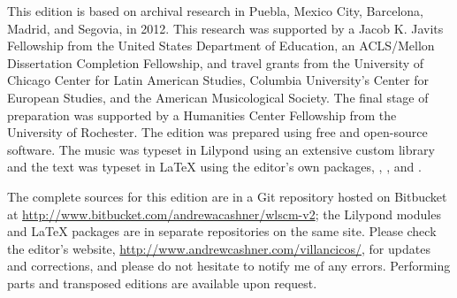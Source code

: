 This edition is based on archival research in Puebla, Mexico City, Barcelona,
Madrid, and Segovia, in 2012.
This research was supported by a Jacob K. Javits Fellowship from the United
States Department of Education, an ACLS/Mellon Dissertation Completion
Fellowship, and travel grants from the University of Chicago Center for Latin
American Studies, Columbia University's Center for European Studies, and the
American Musicological Society.
The final stage of preparation was supported by a Humanities Center Fellowship
from the University of Rochester.
The edition was prepared using free and open-source software.
The music was typeset in Lilypond using an extensive custom library and the
text was typeset in \LaTeX{} using the editor's own packages,
, ,  and
.

The complete sources for this edition are in a Git repository hosted on
Bitbucket at \url{http://www.bitbucket.com/andrewacashner/wlscm-v2}; the
Lilypond modules and LaTeX packages are in separate repositories on the same
site.
Please check the editor's website,
\url{http://www.andrewcashner.com/villancicos/}, for updates and corrections,
and please do not hesitate to notify me of any errors.
Performing parts and transposed editions are available upon request.


